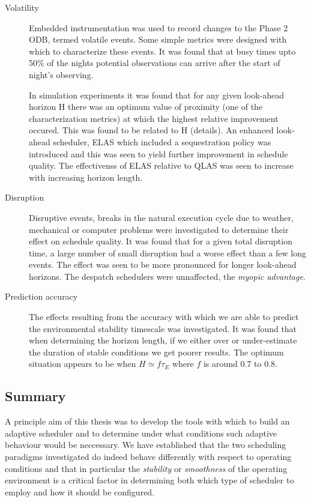 \begin{description}
 \item[Volatility]
Embedded instrumentation was used to record changes to the Phase 2 ODB, termed volatile events. Some simple metrics were designed with which to characterize these events. It was found that at busy times upto 50\% of the nights potential observations can arrive after the start of night's observing.

In simulation experiments it was found that for any given look-ahead horizon H there was an optimum value of proximity (one of the characterization metrics) at which the highest relative improvement occured. This was found to be related to H (details). An enhanced look-ahead scheduler, ELAS which included a sequestration policy was introduced and this was seen to yield further improvement in schedule quality. The effectivenss of ELAS relative to QLAS was seen to increase with increasing horizon length.

\item[Disruption]
Disruptive events, breaks in the natural execution cycle due to weather, mechanical or computer problems were investigated to determine their effect on schedule quality. It was found that for a given total disruption time, a large number of small disruption had a worse effect than a few long events. The effect was seen to be more pronounced for longer look-ahead horizons. The despatch schedulers were unnaffected, the \emph{myopic advantage}.

 \item[Prediction accuracy]
The effects resulting from the accuracy with which we are able to predict the environmental stability timescale was investigated. It was found that when determining the horizon length, if we either over or under-estimate the duration of stable conditions we get poorer results. The optimum situation appears to be when $H \simeq f\tau_E$ where $f$ is around 0.7 to 0.8.
\end{description}

\subsection{Summary}
A principle aim of this thesis was to develop the tools with which to build an adaptive scheduler and to determine under what conditions such adaptive behaviour would be neccessary. We have established that the two scheduling paradigms investigated do indeed behave differently with respect to operating conditions and that in particular the \emph{stability} or \emph{smoothness} of the operating environment is a critical factor in determining both which type of scheduler to employ and how it should be configured.

